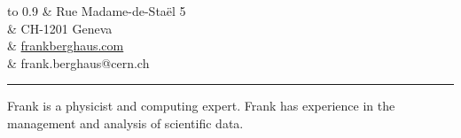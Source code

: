 \documentclass[12pt,a4paper]{article}
\newcommand{\colorrule}[1]
{
  {\color{#1}\hrule height 2pt}
  \vspace{1.0em}
}
\begin{document}
\begin{center}
	\begin{tabu} to 0.9\textwidth {X[l] X[r]}
		                                      & {\small Rue Madame-de-Staël 5} \\
																          & {\small CH-1201 Geneva} \\
																          & \href{http://www.frankberghaus.com}{\small frankberghaus.com} \\
	                                    		& {\small frank.berghaus@cern.ch} \\
	\end{tabu}
\end{center}
\colorrule{NavyBlue}
Frank is a physicist and computing expert. Frank has experience in the management and analysis of scientific data.
\end{document}
